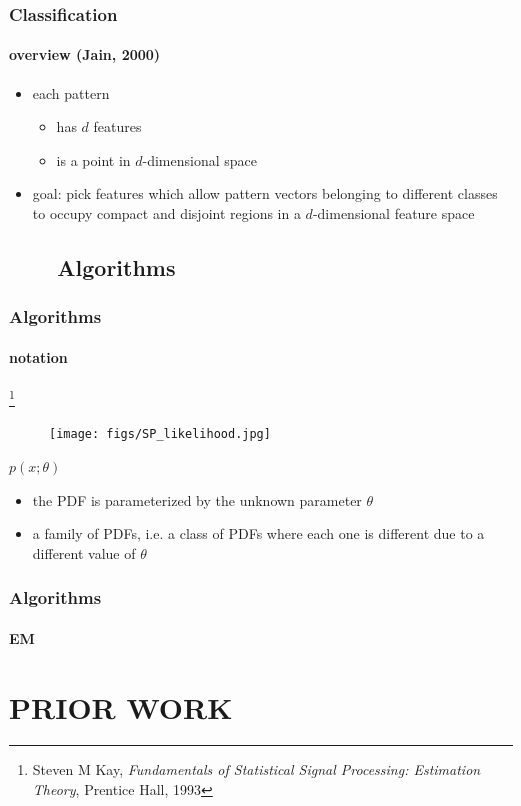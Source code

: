 \begin{frame}
\frametitle{Classification}
\framesubtitle{overview (Jain, 2000)}
\mypagenum
	\begin{itemize}
		\item each pattern 
			\begin{itemize}
				\item has $d$ features
				\item is a point in $d$-dimensional space
			\end{itemize}
		\item {\color{red} goal:} pick features which allow pattern vectors belonging to different classes to occupy compact and disjoint regions in a $d$-dimensional feature space
	\end{itemize}
\end{frame}


\subsection{\ \ \ \ Algorithms}
\begin{frame}
\frametitle{Algorithms}
\framesubtitle{notation}
\footnote {\small Steven M Kay, \emph{Fundamentals of Statistical Signal Processing: Estimation Theory}, Prentice Hall, 1993}
\logoCSIPCPL\mypagenum
	\begin{figure}				
		\texttt{[image: figs/SP\_likelihood.jpg]}
	\end{figure}	
	$p(x;\theta)$
	\begin{itemize}
		\item the PDF is parameterized by the unknown parameter $\theta$
		\item a family of PDFs, i.e. a class of PDFs where each one is different due to a different value of $\theta$
	\end{itemize}			
\end{frame}


\begin{frame}
\frametitle{Algorithms}
\framesubtitle{EM}
\logoCSIPCPL\mypagenum
\end{frame}



\section{PRIOR WORK}

